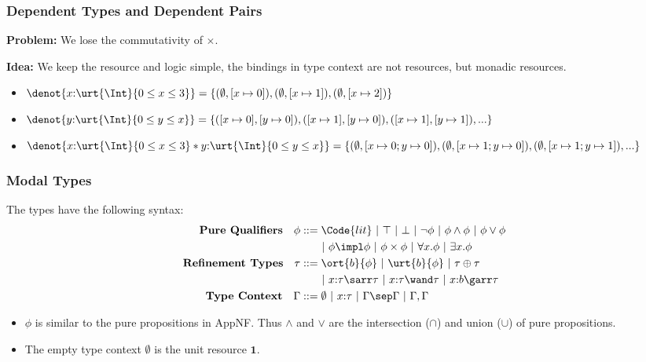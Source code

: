 \begin{frame}[fragile]
    \frametitle{Dependent Types and Dependent Pairs}

\textbf{Problem:} We lose the commutativity of $\times$.

\textbf{Idea:} We keep the resource and logic simple, the bindings in type context are not resources, but monadic resources.

\begin{example}
    \begin{itemize}
    \item $\denot{x{:}\urt{\Int}{0 \leq x \leq 3}} = \{ (\emptyset, [x\mapsto 0]), (\emptyset, [x\mapsto 1]), (\emptyset, [x\mapsto 2]) \}$
    \item $\denot{y{:}\urt{\Int}{0 \leq y \leq x}} = \{ ([x\mapsto 0], [y\mapsto 0]), ([x\mapsto 1], [y\mapsto 0]), ([x\mapsto 1], [y\mapsto 1]), ... \}$
    \item $\denot{x{:}\urt{\Int}{0 \leq x \leq 3} * y{:}\urt{\Int}{0 \leq y \leq x}} = \{ (\emptyset, [x\mapsto 0;y\mapsto 0]), (\emptyset, [x\mapsto 1;y\mapsto 0]), (\emptyset, [x\mapsto 1;y\mapsto 1]), ... \}$
    \end{itemize}
    \end{example}

\end{frame}

\begin{frame}[fragile]
    \frametitle{Modal Types}

\begin{definition} The types have the following syntax:
\begin{align*}
    \textbf{Pure Qualifiers} \quad \phi ::= &\; \Code{lit} ~|~ \top ~|~ \bot ~|~ \neg \phi ~|~ \phi \land \phi ~|~ \phi \lor \phi\\
    & ~|~ \phi \impl \phi ~|~ \phi \times \phi ~|~ \forall x. \phi ~|~ \exists x. \phi \\
    \textbf{Refinement Types} \quad \tau ::= &\; \ort{b}{\phi} ~|~ \urt{b}{\phi} ~|~ \tau \oplus \tau \\
    &~|~ x{:}\tau \sarr \tau ~|~ x{:}\tau \wand \tau ~|~ x{:}b \garr \tau
    \\\textbf{Type Context} \quad \Gamma ::= &\; \emptyset ~|~ x{:}\tau ~|~ \Gamma \sep \Gamma ~|~ \Gamma, \Gamma
\end{align*}
\end{definition}

\begin{itemize}
    \item $\phi$ is similar to the pure propositions in AppNF. Thus $\land$ and $\lor$ are the intersection ($\cap$) and union ($\cup$) of pure propositions.
    \item The empty type context $\emptyset$ is the unit resource $\textbf{1}$.
\end{itemize}

\end{frame}


